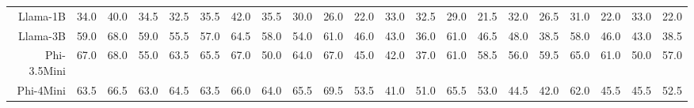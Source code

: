 \documentclass[letterpaper]{article} %
\begin{document}
\begin{table}[t]
\begin{tabular}{rrrrr|rrrr|rrrr|rrrr|rrrr}
Llama-1B & \cellcolor[HTML]{FDE5CC}34.0 & \cellcolor[HTML]{FEEECC}40.0 & \cellcolor[HTML]{FDE6CC}34.5 & \cellcolor[HTML]{FCE3CC}32.5 & \cellcolor[HTML]{FDE8CC}35.5 & \cellcolor[HTML]{FFF2CC}42.0 & \cellcolor[HTML]{FDE8CC}35.5 & \cellcolor[HTML]{FCE0CC}30.0 & \cellcolor[HTML]{FAD7CC}26.0 & \cellcolor[HTML]{F9D1CC}22.0 & \cellcolor[HTML]{FCE1CC}33.0 & \cellcolor[HTML]{FCE0CC}32.5 & \cellcolor[HTML]{FBDCCC}29.0 & \cellcolor[HTML]{F9CFCC}21.5 & \cellcolor[HTML]{FCE1CC}32.0 & \cellcolor[HTML]{FAD8CC}26.5 & \cellcolor[HTML]{FCE0CC}31.0 & \cellcolor[HTML]{F9D1CC}22.0 & \cellcolor[HTML]{FCE3CC}33.0 & \cellcolor[HTML]{F9D1CC}22.0 \\
Llama-3B & \cellcolor[HTML]{DEECCC}59.0 & \cellcolor[HTML]{CCE8CC}68.0 & \cellcolor[HTML]{DEECCC}59.0 & \cellcolor[HTML]{E5EDCC}55.5 & \cellcolor[HTML]{E0ECCC}57.0 & \cellcolor[HTML]{D1E9CC}64.5 & \cellcolor[HTML]{DEECCC}58.0 & \cellcolor[HTML]{E7EDCC}54.0 & \cellcolor[HTML]{DDEBCC}61.0 & \cellcolor[HTML]{FBF1CC}46.0 & \cellcolor[HTML]{FFF0CC}43.0 & \cellcolor[HTML]{FDE6CC}36.0 & \cellcolor[HTML]{D6EACC}61.0 & \cellcolor[HTML]{F6F0CC}46.5 & \cellcolor[HTML]{F3F0CC}48.0 & \cellcolor[HTML]{FEEBCC}38.5 & \cellcolor[HTML]{DCEBCC}58.0 & \cellcolor[HTML]{F6F0CC}46.0 & \cellcolor[HTML]{FDF2CC}43.0 & \cellcolor[HTML]{FEECCC}38.5 \\
Phi-3.5Mini & \cellcolor[HTML]{CEE8CC}67.0 & \cellcolor[HTML]{CCE8CC}68.0 & \cellcolor[HTML]{E6EDCC}55.0 & \cellcolor[HTML]{D5EACC}63.5 & \cellcolor[HTML]{CFE9CC}65.5 & \cellcolor[HTML]{CCE8CC}67.0 & \cellcolor[HTML]{EFEFCC}50.0 & \cellcolor[HTML]{D2E9CC}64.0 & \cellcolor[HTML]{D1E9CC}67.0 & \cellcolor[HTML]{FDF2CC}45.0 & \cellcolor[HTML]{FEEFCC}42.0 & \cellcolor[HTML]{FDE7CC}37.0 & \cellcolor[HTML]{D6EACC}61.0 & \cellcolor[HTML]{DCEBCC}58.5 & \cellcolor[HTML]{E1ECCC}56.0 & \cellcolor[HTML]{D9EBCC}59.5 & \cellcolor[HTML]{CCE8CC}65.0 & \cellcolor[HTML]{D5EACC}61.0 & \cellcolor[HTML]{EDEFCC}50.0 & \cellcolor[HTML]{DEEBCC}57.0 \\
Phi-4Mini & \cellcolor[HTML]{D5EACC}63.5 & \cellcolor[HTML]{CFE9CC}66.5 & \cellcolor[HTML]{D6EACC}63.0 & \cellcolor[HTML]{D3E9CC}64.5 & \cellcolor[HTML]{D3E9CC}63.5 & \cellcolor[HTML]{CEE8CC}66.0 & \cellcolor[HTML]{D2E9CC}64.0 & \cellcolor[HTML]{CFE9CC}65.5 & \cellcolor[HTML]{CCE8CC}69.5 & \cellcolor[HTML]{ECEECC}53.5 & \cellcolor[HTML]{FEEDCC}41.0 & \cellcolor[HTML]{F1EFCC}51.0 & \cellcolor[HTML]{CCE8CC}65.5 & \cellcolor[HTML]{E8EDCC}53.0 & \cellcolor[HTML]{FBF1CC}44.5 & \cellcolor[HTML]{FFF1CC}42.0 & \cellcolor[HTML]{D3E9CC}62.0 & \cellcolor[HTML]{F7F0CC}45.5 & \cellcolor[HTML]{F7F0CC}45.5 & \cellcolor[HTML]{E8EDCC}52.5 \\

\end{tabular}
\end{table}
\end{document}
